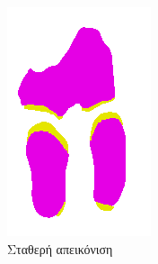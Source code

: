\documentclass[a4paper,12pt]{article}
\begin{document}
\begin{figure}[H]
    \centering

    \begin{subfigure}[t]{0.4\linewidth}
    \includegraphics[width=\linewidth]{original_label_registration_2.png}
    \caption{Σταθερή απεικόνιση}
    \end{subfigure}
    \begin{subfigure}[t]{0.4\linewidth}

\end{subfigure}
\end{figure}
\end{document}
